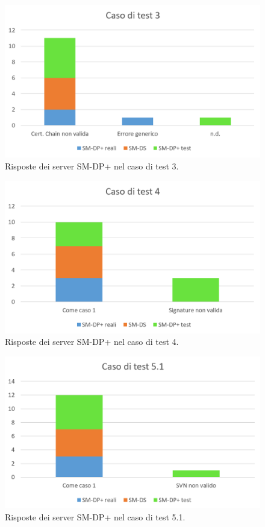 \documentclass[10pt, oneside]{book}
\begin{document}
\begin{figure}
\includegraphics[width=\linewidth]{test-3.png}
\caption{Risposte dei server SM-DP+ nel caso di test 3.}
\label{fig:test-3}
\end{figure}
\begin{figure}
\includegraphics[width=\linewidth]{test-4.png}
\caption{Risposte dei server SM-DP+ nel caso di test 4.}
\label{fig:test-4}
\end{figure}
\begin{figure}
\includegraphics[width=\linewidth]{test-5-1.png}
\caption{Risposte dei server SM-DP+ nel caso di test 5.1.}
\label{fig:test-5-1}
\end{figure}
\end{document}
